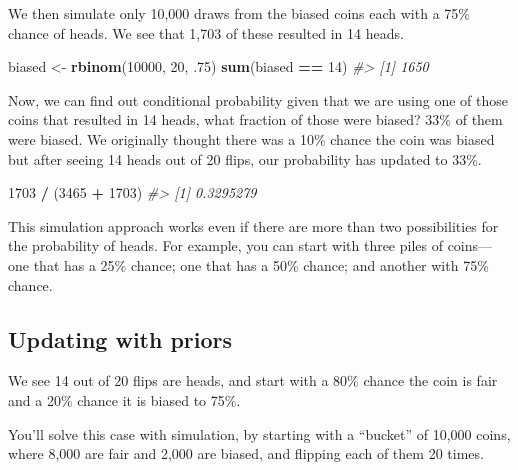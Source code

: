 \documentclass[]{article}
\newenvironment{Shaded}{\begin{snugshade}}{\end{snugshade}}
\newcommand{\CommentTok}[1]{\textcolor[rgb]{0.56,0.35,0.01}{\textit{#1}}}
\newcommand{\DecValTok}[1]{\textcolor[rgb]{0.00,0.00,0.81}{#1}}
\newcommand{\FloatTok}[1]{\textcolor[rgb]{0.00,0.00,0.81}{#1}}
\newcommand{\KeywordTok}[1]{\textcolor[rgb]{0.13,0.29,0.53}{\textbf{#1}}}
\newcommand{\NormalTok}[1]{#1}
\newcommand{\OperatorTok}[1]{\textcolor[rgb]{0.81,0.36,0.00}{\textbf{#1}}}
\newcommand{\StringTok}[1]{\textcolor[rgb]{0.31,0.60,0.02}{#1}}
\begin{document}
We then simulate only 10,000 draws from the biased coins each with a
75\% chance of heads. We see that 1,703 of these resulted in 14 heads.

\begin{Shaded}
\begin{Highlighting}[]
\NormalTok{biased <-}\StringTok{ }\KeywordTok{rbinom}\NormalTok{(}\DecValTok{10000}\NormalTok{, }\DecValTok{20}\NormalTok{, }\FloatTok{.75}\NormalTok{)}
\KeywordTok{sum}\NormalTok{(biased }\OperatorTok{==}\StringTok{ }\DecValTok{14}\NormalTok{)}
\CommentTok{#> [1] 1650}
\end{Highlighting}
\end{Shaded}

Now, we can find out conditional probability given that we are using one
of those coins that resulted in 14 heads, what fraction of those were
biased? 33\% of them were biased. We originally thought there was a 10\%
chance the coin was biased but after seeing 14 heads out of 20 flips,
our probability has updated to 33\%.

\begin{Shaded}
\begin{Highlighting}[]
\DecValTok{1703} \OperatorTok{/}\StringTok{ }\NormalTok{(}\DecValTok{3465} \OperatorTok{+}\StringTok{ }\DecValTok{1703}\NormalTok{)}
\CommentTok{#> [1] 0.3295279}
\end{Highlighting}
\end{Shaded}

This simulation approach works even if there are more than two
possibilities for the probability of heads. For example, you can start
with three piles of coins---one that has a 25\% chance; one that has a
50\% chance; and another with 75\% chance.

\hypertarget{updating-with-priors}{%
\subsection{Updating with priors}\label{updating-with-priors}}

We see 14 out of 20 flips are heads, and start with a 80\% chance the
coin is fair and a 20\% chance it is biased to 75\%.

You'll solve this case with simulation, by starting with a ``bucket'' of
10,000 coins, where 8,000 are fair and 2,000 are biased, and flipping
each of them 20 times.
\end{document}
